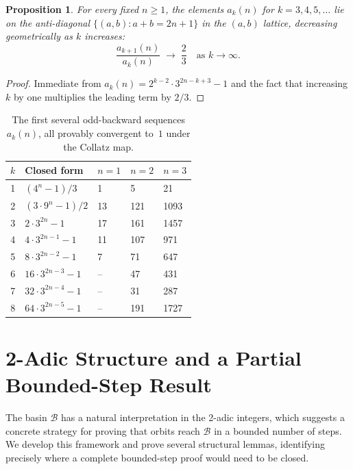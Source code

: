 \documentclass[12pt]{amsart}
\newtheorem{proposition}[theorem]{Proposition}
\theoremstyle{definition}
\newcommand{\basin}{\mathcal{B}}
\begin{document}
\begin{proposition}
  For every fixed $n \geq 1$, the elements $a_k(n)$ for $k = 3, 4, 5, \ldots$
  lie on the \emph{anti-diagonal} $\{(a,b) : a + b = 2n + 1\}$ in the
  $(a, b)$ lattice, decreasing geometrically as $k$ increases:
  \[
    \frac{a_{k+1}(n)}{a_k(n)} \;\longrightarrow\; \frac{2}{3}
    \quad\text{as } k \to \infty.
  \]
\end{proposition}

\begin{proof}
  Immediate from $a_k(n) = 2^{k-2} \cdot 3^{2n-k+3} - 1$ and the fact that
  increasing $k$ by one multiplies the leading term by $2/3$.
\end{proof}

\begin{table}[h]
\centering
\renewcommand{\arraystretch}{1.3}
\begin{tabular}{@{}cllll@{}}
\toprule
$k$ & Closed form & $n=1$ & $n=2$ & $n=3$ \\
\midrule
1 & $(4^n - 1)/3$               & 1   & 5    & 21   \\
2 & $(3 \cdot 9^n - 1)/2$       & 13  & 121  & 1093 \\
3 & $2 \cdot 3^{2n} - 1$        & 17  & 161  & 1457 \\
4 & $4 \cdot 3^{2n-1} - 1$      & 11  & 107  & 971  \\
5 & $8 \cdot 3^{2n-2} - 1$      & 7   & 71   & 647  \\
6 & $16 \cdot 3^{2n-3} - 1$     & --  & 47   & 431  \\
7 & $32 \cdot 3^{2n-4} - 1$     & --  & 31   & 287  \\
8 & $64 \cdot 3^{2n-5} - 1$     & --  & 191  & 1727 \\
\bottomrule
\end{tabular}
\caption{The first several odd-backward sequences $a_k(n)$, all provably
         convergent to~$1$ under the Collatz map.}
\label{tab:sequences}
\end{table}

\section{2-Adic Structure and a Partial Bounded-Step Result}\label{sec:2adic}

The basin $\basin$ has a natural interpretation in the 2-adic integers, which
suggests a concrete strategy for proving that orbits reach $\basin$ in a
bounded number of steps.  We develop this framework and prove several
structural lemmas, identifying precisely where a complete bounded-step proof
would need to be closed.
\end{document}
